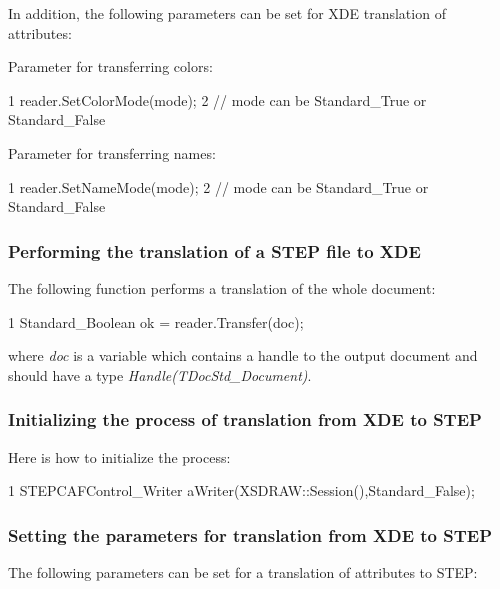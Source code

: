 In addition, the following parameters can be set for X\+DE translation of attributes\+:
\begin{DoxyItemize}
\item Parameter for transferring colors\+: 
\begin{DoxyCode}
1 reader.SetColorMode(mode); 
2 // mode can be Standard\_True or Standard\_False 
\end{DoxyCode}

\item Parameter for transferring names\+: 
\begin{DoxyCode}
1 reader.SetNameMode(mode); 
2 // mode can be Standard\_True or Standard\_False 
\end{DoxyCode}
 
\end{DoxyItemize}\hypertarget{occt_user_guides__step_occt_step_7_1_4}{}\subsubsection{Performing the translation of a S\+T\+E\+P file to X\+DE}\label{occt_user_guides__step_occt_step_7_1_4}
The following function performs a translation of the whole document\+: 
\begin{DoxyCode}
1 Standard\_Boolean ok = reader.Transfer(doc); 
\end{DoxyCode}
 where {\itshape doc} is a variable which contains a handle to the output document and should have a type {\itshape Handle(\+T\+Doc\+Std\+\_\+\+Document)}. \hypertarget{occt_user_guides__step_occt_step_7_1_5}{}\subsubsection{Initializing the process of translation from X\+D\+E to S\+T\+EP}\label{occt_user_guides__step_occt_step_7_1_5}
Here is how to initialize the process\+: 
\begin{DoxyCode}
1 STEPCAFControl\_Writer aWriter(XSDRAW::Session(),Standard\_False); 
\end{DoxyCode}
 \hypertarget{occt_user_guides__step_occt_step_7_1_6}{}\subsubsection{Setting the parameters for translation from X\+D\+E to S\+T\+EP}\label{occt_user_guides__step_occt_step_7_1_6}
The following parameters can be set for a translation of attributes to S\+T\+EP\+:
